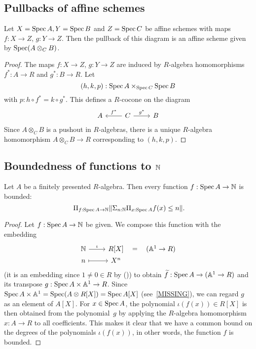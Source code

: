 \subsection{Pullbacks of affine schemes}

\begin{lemma}%
  \label{affine-fiber-product}
  Let $X=\operatorname{Spec} A,Y=\operatorname{Spec} B$ and $Z=\operatorname{Spec} C$ be affine schemes
  with maps $f:X\to Z$, $g:Y\to Z$.
  Then the pullback of this diagram is an affine scheme given by $\operatorname{Spec} (A\otimes_C B)$.
\end{lemma}

\begin{proof}
  The maps $f:X\to Z$, $g:Y\to Z$ are induced by $R$-algebra homomorphisms $f^*:A\to R$ and $g^*:B\to R$.
  Let
  \[ (h,k,p) : \operatorname{Spec} A \times_{\operatorname{Spec} C} \operatorname{Spec} B \]
  with $p:h\circ f^*=k\circ g^* $.
  This defines a $R$-cocone on the diagram
  \[
    \begin{tikzcd}
      A & C\ar[r,"g^*"]\ar[l,"f^*",swap] & B
    \end{tikzcd}
  \]
  Since $A\otimes_C B$ is a pushout in $R$-algebras,
  there is a unique $R$-algebra homomorphism $A\otimes_C B \to R$ corresponding to $(h,k,p)$.
\end{proof}

\subsection{Boundedness of functions to $\mathbb{N}$}

\begin{theorem}%
  \label{boundedness}
  Let $A$ be a finitely presented $R$-algebra.
  Then every function $f : \operatorname{Spec} A \to \mathbb{N}$ is bounded:
  \[ \Pi_{f : \Spec A \to \N} \propTrunc{\Sigma_{n : \N} \Pi_{x : \Spec A} f(x) \le n}
     \rlap{.} \]
\end{theorem}

\begin{proof}
  Let $f : \operatorname{Spec} A \to \mathbb{N}$ be given.
  We compose this function with the embedding
  \[ \begin{tikzcd}[row sep=0mm]
    \N \ar[r, "\iota"] & R[X] \ar[r, phantom, "{=}"] & (\A^1 \to R) \\
    n \ar[r, mapsto] & X^n
  \end{tikzcd} \]
  (it is an embedding since $1 \neq 0 \in R$ by ())
  to obtain $\widetilde{f} : \operatorname{Spec} A \to (\mathbb{A}^1 \to R)$
  and its transpose $g : \operatorname{Spec} A \times \mathbb{A}^1 \to R$.
  Since $\operatorname{Spec} A \times \mathbb{A}^1 = \operatorname{Spec} (A \otimes R[X]) = \operatorname{Spec} A[X]$
  (see~\ref{MISSING}),
  we can regard $g$ as an element of $A[X]$.
  For $x \in \operatorname{Spec} A$,
  the polynomial $\iota(f(x)) \in R[X]$ is then obtained from the polynomial~$g$
  by applying the $R$-algebra homomorphism $x : A \to R$ to all coefficients.
  This makes it clear that
  we have a common bound on the degrees of the polynomials $\iota(f(x))$,
  in other words,
  the function $f$ is bounded.
\end{proof}
